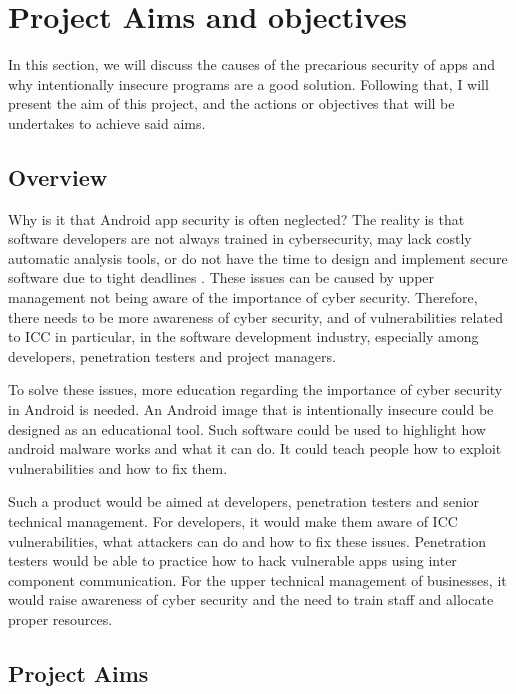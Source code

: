 	\section{Project Aims and objectives}
		\label{sec:intro_objective} 
		
		In this section, we will discuss the causes of the precarious security of apps and why intentionally insecure programs are a good solution. Following that, I will present the aim of this project, and the actions or objectives that will be undertakes to achieve said aims. 
		
		\subsection{Overview}
		
		Why is it that Android app security is often neglected? The reality is that software developers are not always trained in cybersecurity, may lack costly automatic analysis tools, or do not have the time to design and implement secure software due to tight deadlines \cite{malwarebytes_blog}. These issues can be caused by upper management not being aware of the importance of cyber security. Therefore, there needs to be more awareness of cyber security, and of vulnerabilities related to ICC in particular, in the software development industry, especially among developers, penetration testers and project managers.
		
		To solve these issues, more education regarding the importance of cyber security in Android is needed. An Android image that is intentionally insecure could be designed as an educational tool. Such software could be used to highlight how android malware works and what it can do. It could teach people how to exploit vulnerabilities and how to fix them.
		
        Such a product would be aimed at developers, penetration testers and senior technical management. For developers, it would make them aware of ICC vulnerabilities, what attackers can do and how to fix these issues. Penetration testers would be able to practice how to hack vulnerable apps using inter component communication. For the upper technical management of businesses, it would raise awareness of cyber security and the need to train staff and allocate proper resources.
        
        \subsection{Project Aims}
        
